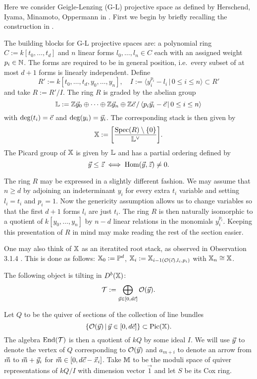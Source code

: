 \documentclass[12pt]{amsart}
\begin{document}
Here we consider Geigle-Lenzing (G-L) projective space as defined by Herschend, Iyama, Minamoto, Oppermann in \cite{HIMO}.
First we begin by briefly recalling the construction in \cite{HIMO}. 

The building blocks for G-L projective spaces are: a polynomial ring $C:= k[t_0, \ldots, t_d]$ and $n$ linear forms $l_0,\ldots,l_n \in C$ each with an assigned weight $p_i \in \mathbb{N}$. 
The forms are required to be in general position, i.e.\ every subset of at most $d+1$ forms is linearly independent. 
Define $$R':= k[t_0,\ldots, t_d, y_0, \ldots, y_n],  \quad I := \langle y_i^{p_i} - l_i \, | \, 0\leq i \leq n \rangle \subset R'$$ and take $R:= R'/I$. 
The ring $R$ is graded by the abelian group $$\mathbb{L}:= \mathbb{Z} {\vec{y}}_0 \oplus \cdots \oplus \mathbb{Z} {\vec{y}}_n \oplus \mathbb{Z} {\vec{c}} \,/\, \langle p_i {\vec{y}}_i - {\vec{c}} \, | \, 0\leq i \leq n \rangle$$ with $\deg(t_i)={\vec{c}}$ and $\deg(y_i) = {\vec{y}}_i$. 
The corresponding stack is then given by $$\mathbb{X}:= \bigg[\frac{\operatorname{Spec}(R) \setminus \{0\}}{\mathbb{L}^\vee}\bigg].$$ 
The Picard group of $\mathbb{X}$ is given by $\mathbb{L}$ and has a partial ordering defined by $${\vec{y}} \leq {\vec{z}} \iff \operatorname{Hom}({\vec{y}}, {\vec{z}}) \neq 0.$$

The ring $R$ may be expressed in a slightly different fashion. 
We may assume that $n\geq d$ by adjoining an indeterminant $y_i$ for every extra $t_i$ variable and setting $l_i= t_i$ and $p_i=1$. 
Now the genericity assumption allows us to change variables so that the first $d+1$ forms $l_i$ are just $t_i$.
The ring $R$ is then naturally isomorphic to a quotient of $k[y_0, \ldots, y_n]$ by $n-d$ linear relations in the monomials $y_i^{p_i}$.
Keeping this presentation of $R$ in mind may make reading the rest of the section easier.

One may also think of $\mathbb{X}$ as an iteratited root stack, as observed in Observation 3.1.4 \cite{HIMO}. This is done as follows: $\mathbb{X}_0:= \mathbb{P}^d$, $\mathbb{X}_i := \mathbb{X}_{i-1 (\mathcal{O}({\vec{c}}),l_i,p_i)}$ with $\mathbb{X}_n \cong \mathbb{X}$.

\begin{theorem}\cite[Theorem 6.1.2]{HIMO}
The following object is tilting in $D^b(\mathbb{X})$: $$\mathcal{T}:= \bigoplus_{{\vec{y}} \in [0,d{\vec{c}}]} \mathcal{O}({\vec{y}}).$$
\end{theorem}

Let $Q$ to be the quiver of sections of the collection of line bundles $$\{\mathcal{O}({\vec{y}})\,|\,{\vec{y}} \in [0,d{\vec{c}}]\}\subset \operatorname{Pic}(\mathbb{X}).$$
The algebra $\operatorname{End}(\mathcal{T})$ is then a quotient of $kQ$ by some ideal $I$.
We will use ${\vec{y}}$ to denote the vertex of $Q$ corresponding to $\mathcal{O}({\vec{y}})$ and $a_{m+i}$ to denote an arrow from ${\vec{m}}$ to ${\vec{m}}+{\vec{y}}_i$ for ${\vec{m}} \in [0, d{\vec{c}} - {\vec{x}}_i]$.
Take $\mathbb{M}$ to be the moduli space of quiver representations of $kQ/I$ with dimension vector $\vec{1}$ and let $S$ be its Cox ring.
\end{document}
